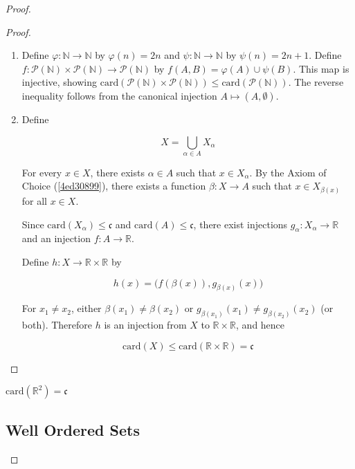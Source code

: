 \begin{proof}
\begin{proof}
    \begin{enumerate}
        \item  Define $\varphi: \mathbb{N} \to \mathbb{N}$ by $\varphi(n) = 2n$ and $\psi: \mathbb{N} \to \mathbb{N}$ by $\psi(n) = 2n + 1$.
    Define $f: \mathcal{P}(\mathbb{N}) \times \mathcal{P}(\mathbb{N}) \to \mathcal{P}(\mathbb{N})$ by $f(A, B) = \varphi(A) \cup \psi(B)$.
    This map is injective, showing $\mathrm{card}(\mathcal{P}(\mathbb{N}) \times \mathcal{P}(\mathbb{N})) \le \mathrm{card}(\mathcal{P}(\mathbb{N}))$.
    The reverse inequality follows from the canonical injection $A \mapsto (A, \emptyset)$.

        \item Define

        \[
            X = \bigcup_{\alpha \in A}X_{\alpha}
        \]

        For every $x \in X$, there exists $\alpha \in A$ such that $x \in X_{\alpha}$. By the Axiom of Choice (\cref{4ed30899}),
        there exists a function $\beta: X \to A$ such that $x \in X_{\beta(x)}$ for all $x \in X$.

        Since $\mathrm{card}(X_{\alpha}) \le \mathfrak{c}$ and $\mathrm{card}(A) \le \mathfrak{c}$, there exist injections $g_{\alpha}: X_{\alpha} \to \mathbb{R}$
        and an injection $f: A \to \mathbb{R}$.

        Define $h: X \to \mathbb{R} \times \mathbb{R}$ by

        \[
            h(x) = \big( f(\beta(x)), g_{\beta(x)}(x) \big)
        \]

        For $x_1 \ne x_2$, either $\beta(x_1) \ne \beta(x_2)$ or $g_{\beta(x_1)}(x_1) \ne g_{\beta(x_2)}(x_2)$ (or both).
        Therefore $h$ is an injection from $X$ to $\mathbb{R} \times \mathbb{R}$, and hence

        \[
            \mathrm{card}(X) \le \mathrm{card}(\mathbb{R} \times \mathbb{R}) = \mathfrak{c}
        \]
    \end{enumerate}
\end{proof}

\begin{corollary}
    $\mathrm{card}(\mathbb{R}^2) = \mathfrak{c}$
\end{corollary}

\subsection{Well Ordered Sets}


\end{proof}
